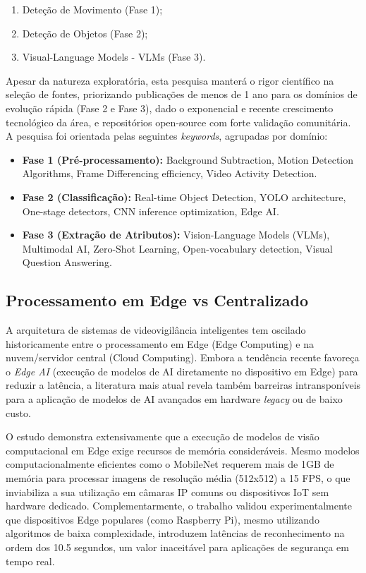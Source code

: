 \begin{enumerate}
	\item Deteção de Movimento (Fase 1);
	\item Deteção de Objetos (Fase 2);
	\item Visual-Language Models - \glspl{VLM} (Fase 3).
\end{enumerate}

Apesar da natureza exploratória, esta pesquisa manterá o rigor científico na seleção de fontes, priorizando publicações de menos de 1 ano para os domínios de evolução rápida (Fase 2 e Fase 3), dado o exponencial e recente crescimento tecnológico da área, e repositórios open-source com forte validação comunitária. A pesquisa foi orientada pelas seguintes \textit{keywords}, agrupadas por domínio:

\begin{itemize}
	\item \textbf{Fase 1 (Pré-processamento):} Background Subtraction, Motion Detection Algorithms, Frame Differencing efficiency, Video Activity Detection.
	\item \textbf{Fase 2 (Classificação):} Real-time Object Detection, \gls{YOLO} architecture, One-stage detectors, \gls{CNN} inference optimization, Edge \gls{AI}.
	\item \textbf{Fase 3 (Extração de Atributos):} Vision-Language Models (\glspl{VLM}), Multimodal \gls{AI}, Zero-Shot Learning, Open-vocabulary detection, Visual Question Answering.
\end{itemize}

\subsection{Processamento em Edge vs Centralizado}
\label{subsec:limitacoes_edge}

A arquitetura de sistemas de videovigilância inteligentes tem oscilado historicamente entre o processamento em Edge (Edge Computing) e na nuvem/servidor central (Cloud Computing). Embora a tendência recente favoreça o \textit{Edge AI} (execução de modelos de \gls{AI} diretamente no dispositivo em Edge) para reduzir a latência, a literatura mais atual revela também barreiras intransponíveis para a aplicação de modelos de \gls{AI} avançados em hardware \textit{legacy} ou de baixo custo.

O estudo \cite{bai_decade_2025} demonstra extensivamente que a execução de modelos de visão computacional em Edge exige recursos de memória consideráveis. Mesmo modelos computacionalmente eficientes como o MobileNet requerem mais de 1GB de memória para processar imagens de resolução média (512x512) a 15 \gls{FPS}, o que inviabiliza a sua utilização em câmaras \gls{IP} comuns ou dispositivos IoT sem hardware dedicado. Complementarmente, o trabalho \cite{pecolt_personal_2025} validou experimentalmente que dispositivos Edge populares (como Raspberry Pi), mesmo utilizando algoritmos de baixa complexidade, introduzem latências de reconhecimento na ordem dos 10.5 segundos, um valor inaceitável para aplicações de segurança em tempo real.

